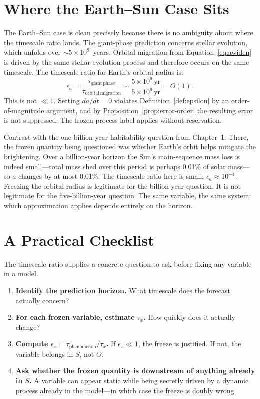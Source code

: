 \documentclass[11pt]{book}
\theoremstyle{plain}
\theoremstyle{definition}
\theoremstyle{remark}
\begin{document}
\section{Where the Earth--Sun Case Sits}

The Earth--Sun case is clean precisely because there is no ambiguity about where the timescale ratio lands. The giant-phase prediction concerns stellar evolution, which unfolds over $\sim 5\times 10^9$~years. Orbital migration from Equation~\eqref{eq:awiden} is driven by the same stellar-evolution process and therefore occurs on the same timescale. The timescale ratio for Earth's orbital radius is:
\[
\epsilon_a = \frac{\tau_{\mathrm{giant\,phase}}}{\tau_{\mathrm{orbital\,migration}}} \sim \frac{5\times 10^9\,\text{yr}}{5\times 10^9\,\text{yr}} = O(1).
\]
This is not $\ll 1$. Setting $da/dt = 0$ violates Definition~\ref{def:epsilon} by an order-of-magnitude argument, and by Proposition~\ref{prop:error-order} the resulting error is not suppressed. The frozen-process label applies without reservation.

Contrast with the one-billion-year habitability question from Chapter~1. There, the frozen quantity being questioned was whether Earth's orbit helps mitigate the brightening. Over a billion-year horizon the Sun's main-sequence mass loss is indeed small---total mass shed over this period is perhaps 0.01\% of solar mass---so $a$ changes by at most 0.01\%. The timescale ratio here is small: $\epsilon_a \approx 10^{-4}$. Freezing the orbital radius is legitimate for the billion-year question. It is not legitimate for the five-billion-year question. The same variable, the same system: which approximation applies depends entirely on the horizon.

\section{A Practical Checklist}

The timescale ratio supplies a concrete question to ask before fixing any variable in a model.

\begin{enumerate}[label=\arabic*.,itemsep=4pt]
\item \textbf{Identify the prediction horizon.} What timescale does the forecast actually concern?
\item \textbf{For each frozen variable, estimate $\tau_x$.} How quickly does it actually change?
\item \textbf{Compute $\epsilon_x = \tau_{\mathrm{phenomenon}}/\tau_x$.} If $\epsilon_x \ll 1$, the freeze is justified. If not, the variable belongs in $S$, not $\Theta$.
\item \textbf{Ask whether the frozen quantity is downstream of anything already in $S$.} A variable can appear static while being secretly driven by a dynamic process already in the model---in which case the freeze is doubly wrong.
\end{enumerate}
\end{document}
